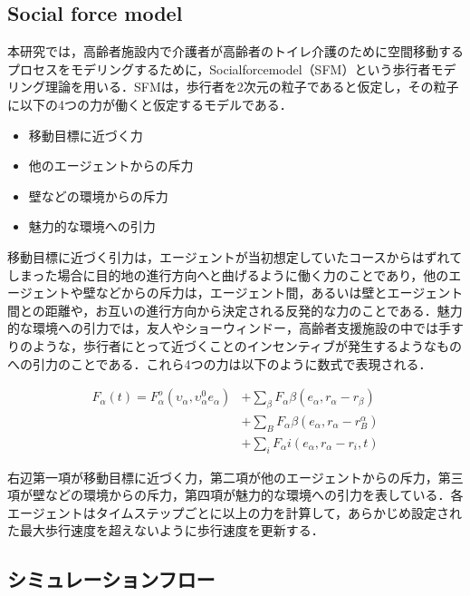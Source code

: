 \subsection{Social force model}

本研究では，高齢者施設内で介護者が高齢者のトイレ介護のために空間移動するプロセスをモデリングするために，Socialforcemodel（SFM）\cite{SFM}という歩行者モデリング理論を用いる．SFMは，歩行者を2次元の粒子であると仮定し，その粒子に以下の4つの力が働くと仮定するモデルである．

\begin{itemize}
 \item 移動目標に近づく力
 \item 他のエージェントからの斥力
 \item 壁などの環境からの斥力
 \item 魅力的な環境への引力
\end{itemize}

移動目標に近づく引力は，エージェントが当初想定していたコースからはずれてしまった場合に目的地の進行方向へと曲げるように働く力のことであり，他のエージェントや壁などからの斥力は，エージェント間，あるいは壁とエージェント間との距離や，お互いの進行方向から決定される反発的な力のことである．魅力的な環境への引力では，友人やショーウィンドー，高齢者支援施設の中では手すりのような，歩行者にとって近づくことのインセンティブが発生するようなものへの引力のことである．これら4つの力は以下のように数式で表現される．

\begin{equation}
\begin{split}
 F_α(t)=F_α^o(υ_α,υ_α^0e_α)&+\sum_{β}F_αβ(e_α,r_α-r_β)\\
 &+\sum_{B}F_αβ(e_α,r_α-r_B^α)\\
 &+\sum_{i}F_αi(e_α,r_α-r_i,t)
\end{split}
\end{equation}

右辺第一項が移動目標に近づく力，第二項が他のエージェントからの斥力，第三項が壁などの環境からの斥力，第四項が魅力的な環境への引力を表している．各エージェントはタイムステップごとに以上の力を計算して，あらかじめ設定された最大歩行速度を超えないように歩行速度を更新する．

\subsection{シミュレーションフロー}

